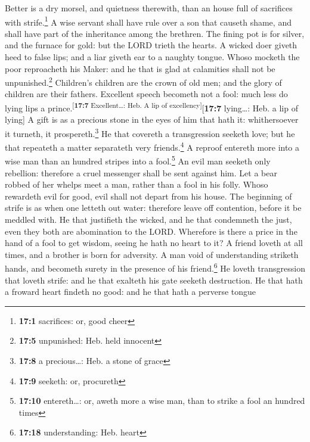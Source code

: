  Better is a dry morsel, and quietness therewith, than an
house full of sacrifices with strife.\footnote{\textbf{17:1} sacrifices:
  or, good cheer}  A wise servant shall have rule over a
son that causeth shame, and shall have part of the inheritance among the
brethren.  The fining pot is for silver, and the furnace
for gold: but the LORD trieth the hearts.  A wicked doer
giveth heed to false lips; and a liar giveth ear to a naughty tongue.
 Whoso mocketh the poor reproacheth his Maker: and he that
is glad at calamities shall not be unpunished.\footnote{\textbf{17:5}
  unpunished: Heb. held innocent}  Children's children are
the crown of old men; and the glory of children are their fathers.
 Excellent speech becometh not a fool: much less do lying
lips a prince.\textsuperscript{{[}\textbf{17:7} Excellent\ldots: Heb. A
lip of excellency{]}}{[}\textbf{17:7} lying\ldots: Heb. a lip of
lying{]}  A gift is as a precious stone in the eyes of him
that hath it: whithersoever it turneth, it prospereth.\footnote{\textbf{17:8}
  a precious\ldots: Heb. a stone of grace}  He that
covereth a transgression seeketh love; but he that repeateth a matter
separateth very friends.\footnote{\textbf{17:9} seeketh: or, procureth}
 A reproof entereth more into a wise man than an hundred
stripes into a fool.\footnote{\textbf{17:10} entereth\ldots: or, aweth
  more a wise man, than to strike a fool an hundred times}
 An evil man seeketh only rebellion: therefore a cruel
messenger shall be sent against him.  Let a bear robbed
of her whelps meet a man, rather than a fool in his folly.
 Whoso rewardeth evil for good, evil shall not depart
from his house.  The beginning of strife is as when one
letteth out water: therefore leave off contention, before it be meddled
with.  He that justifieth the wicked, and he that
condemneth the just, even they both are abomination to the LORD.
 Wherefore is there a price in the hand of a fool to get
wisdom, seeing he hath no heart to it?  A friend loveth
at all times, and a brother is born for adversity.  A man
void of understanding striketh hands, and becometh surety in the
presence of his friend.\footnote{\textbf{17:18} understanding: Heb.
  heart}  He loveth transgression that loveth strife: and
he that exalteth his gate seeketh destruction.  He that
hath a froward heart findeth no good: and he that hath a perverse tongue
